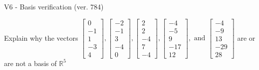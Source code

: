 \begin{exercise}
  \begin{exerciseTitle}V6 - Basis verification (ver. 784)\end{exerciseTitle}
  \begin{exerciseStatement}
    Explain why the vectors \(\left[\begin{array}{r}
0 \\
-1 \\
1 \\
-3 \\
4
\end{array}\right] , \left[\begin{array}{r}
-2 \\
-1 \\
3 \\
-4 \\
0
\end{array}\right] , \left[\begin{array}{r}
2 \\
2 \\
-4 \\
7 \\
-4
\end{array}\right] , \left[\begin{array}{r}
-4 \\
-5 \\
9 \\
-17 \\
12
\end{array}\right] , \text{ and } \left[\begin{array}{r}
-4 \\
-9 \\
13 \\
-29 \\
28
\end{array}\right]\) are or are not a basis of \(\mathbb{R}^5\)	



\end{exerciseStatement}
\end{exercise}

